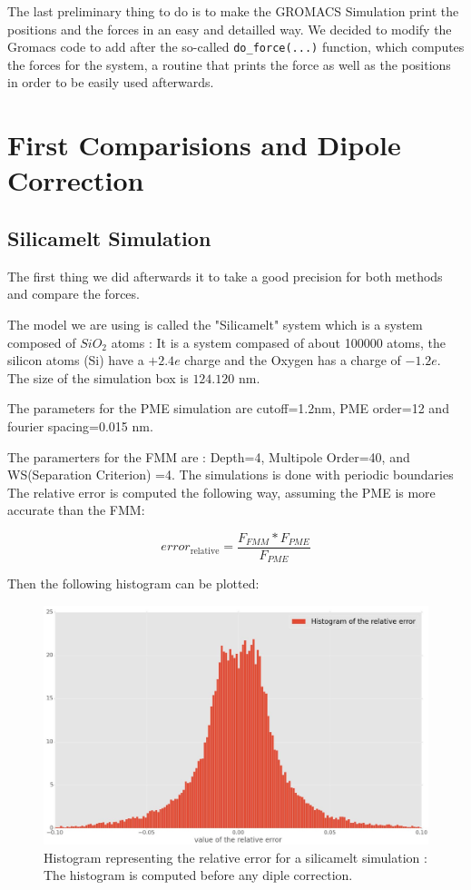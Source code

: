 \documentclass[11pt,twoside,a4paper]{report}
\begin{document}
The last preliminary thing to do is to make the GROMACS Simulation print the positions and the forces in an easy and detailled way. We decided to modify the Gromacs code to add after the so-called {\tt{do\_force(...)}} function, which computes the forces for the system, a routine that prints the force as well as the positions in order to be
 easily used afterwards. 

\section{First Comparisions and Dipole Correction}

\subsection{Silicamelt Simulation}

The first thing we did afterwards it to take a good precision for both methods and compare the forces.

The model we are using is called the "Silicamelt" system which is a system composed of $SiO_2$ atoms : It is a system compased of about 100000 atoms, the silicon atoms (Si) have a $+2.4e$ charge and the Oxygen has a charge of $-1.2e$.
The size of the simulation box is $124.120$ nm.

The parameters for the PME simulation are cutoff=1.2nm, PME order=12 and fourier spacing=0.015 nm. 

The paramerters for the FMM are : Depth=4, Multipole Order=40, and WS(Separation Criterion) =4. The simulations is done with periodic boundaries \\

The relative error is computed the following way, assuming the PME is more accurate than the FMM:

\begin{equation}
	error_{\text{relative}} = \frac{F_{FMM} * F_{PME}}{F_{PME}}
\end{equation}

Then the following histogram can be plotted:

\begin{figure}[H]

   \includegraphics[scale=0.25]{hist_nocorrection.jpeg}
    \centering 
    \caption{Histogram representing the relative error for a silicamelt simulation : The histogram is computed before any diple correction.}    
   \end{figure}   
\end{document}
